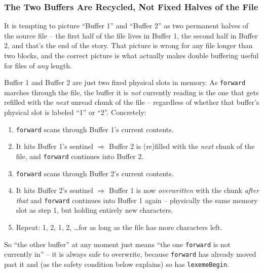 \documentclass[full-course-notes.tex]{subfiles}
\begin{document}
\subsubsection{The Two Buffers Are Recycled, Not Fixed Halves of the File}
\label{sec:l6-lexgen-buffer-cycle}

\dbtag It is tempting to picture ``Buffer 1'' and ``Buffer 2'' as two permanent halves of the
source file -- the first half of the file lives in Buffer 1, the second half in Buffer 2, and
that's the end of the story. That picture is wrong for any file longer than two blocks, and the
correct picture is what actually makes double buffering useful for files of \emph{any} length.

\begin{coreidea}
Buffer 1 and Buffer 2 are just two fixed physical slots in memory. As \texttt{forward} marches
through the file, the buffer it is \emph{not} currently reading is the one that gets refilled
with the \emph{next} unread chunk of the file -- regardless of whether that buffer's physical
slot is labeled ``1'' or ``2''. Concretely:
\begin{enumerate}
  \item \texttt{forward} scans through Buffer 1's current contents.
  \item It hits Buffer 1's sentinel $\Rightarrow$ Buffer 2 is (re)filled with the \emph{next}
  chunk of the file, and \texttt{forward} continues into Buffer 2.
  \item \texttt{forward} scans through Buffer 2's current contents.
  \item It hits Buffer 2's sentinel $\Rightarrow$ Buffer 1 is now \emph{overwritten} with the
  chunk \emph{after that} and \texttt{forward} continues into Buffer 1 again -- physically the
  same memory slot as step 1, but holding entirely new characters.
  \item Repeat: 1, 2, 1, 2, \dots for as long as the file has more characters left.
\end{enumerate}
So ``the other buffer'' at any moment just means ``the one \texttt{forward} is not currently
in'' -- it is always safe to overwrite, because \texttt{forward} has already moved past it and
(as the safety condition below explains) so has \texttt{lexemeBegin}.
\end{coreidea}
\end{document}

